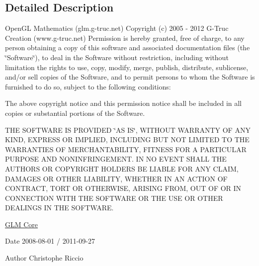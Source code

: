 \subsection{Detailed Description}
Open\-G\-L Mathematics (glm.\-g-\/truc.\-net) Copyright (c) 2005 -\/ 2012 G-\/\-Truc Creation (www.\-g-\/truc.\-net) Permission is hereby granted, free of charge, to any person obtaining a copy of this software and associated documentation files (the \char`\"{}\-Software\char`\"{}), to deal in the Software without restriction, including without limitation the rights to use, copy, modify, merge, publish, distribute, sublicense, and/or sell copies of the Software, and to permit persons to whom the Software is furnished to do so, subject to the following conditions\-:

The above copyright notice and this permission notice shall be included in all copies or substantial portions of the Software.

T\-H\-E S\-O\-F\-T\-W\-A\-R\-E I\-S P\-R\-O\-V\-I\-D\-E\-D \char`\"{}\-A\-S I\-S\char`\"{}, W\-I\-T\-H\-O\-U\-T W\-A\-R\-R\-A\-N\-T\-Y O\-F A\-N\-Y K\-I\-N\-D, E\-X\-P\-R\-E\-S\-S O\-R I\-M\-P\-L\-I\-E\-D, I\-N\-C\-L\-U\-D\-I\-N\-G B\-U\-T N\-O\-T L\-I\-M\-I\-T\-E\-D T\-O T\-H\-E W\-A\-R\-R\-A\-N\-T\-I\-E\-S O\-F M\-E\-R\-C\-H\-A\-N\-T\-A\-B\-I\-L\-I\-T\-Y, F\-I\-T\-N\-E\-S\-S F\-O\-R A P\-A\-R\-T\-I\-C\-U\-L\-A\-R P\-U\-R\-P\-O\-S\-E A\-N\-D N\-O\-N\-I\-N\-F\-R\-I\-N\-G\-E\-M\-E\-N\-T. I\-N N\-O E\-V\-E\-N\-T S\-H\-A\-L\-L T\-H\-E A\-U\-T\-H\-O\-R\-S O\-R C\-O\-P\-Y\-R\-I\-G\-H\-T H\-O\-L\-D\-E\-R\-S B\-E L\-I\-A\-B\-L\-E F\-O\-R A\-N\-Y C\-L\-A\-I\-M, D\-A\-M\-A\-G\-E\-S O\-R O\-T\-H\-E\-R L\-I\-A\-B\-I\-L\-I\-T\-Y, W\-H\-E\-T\-H\-E\-R I\-N A\-N A\-C\-T\-I\-O\-N O\-F C\-O\-N\-T\-R\-A\-C\-T, T\-O\-R\-T O\-R O\-T\-H\-E\-R\-W\-I\-S\-E, A\-R\-I\-S\-I\-N\-G F\-R\-O\-M, O\-U\-T O\-F O\-R I\-N C\-O\-N\-N\-E\-C\-T\-I\-O\-N W\-I\-T\-H T\-H\-E S\-O\-F\-T\-W\-A\-R\-E O\-R T\-H\-E U\-S\-E O\-R O\-T\-H\-E\-R D\-E\-A\-L\-I\-N\-G\-S I\-N T\-H\-E S\-O\-F\-T\-W\-A\-R\-E.

\hyperlink{group__core}{G\-L\-M Core}

\begin{DoxyDate}{Date}
2008-\/08-\/01 / 2011-\/09-\/27 
\end{DoxyDate}
\begin{DoxyAuthor}{Author}
Christophe Riccio 
\end{DoxyAuthor}
